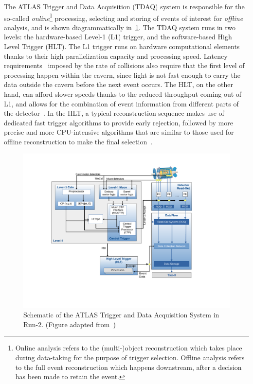 The ATLAS Trigger and Data Acquisition (TDAQ) system is responsible for the so-called \textit{online}\footnote{\label{foot:offline} Online analysis refers to the (multi-)object reconstruction which takes place during data-taking for the purpose of trigger selection. Offline analysis refers to the full event reconstruction which happens downstream, after a decision has been made to retain the event.} processing, selecting and storing of events of interest for \textit{offline} analysis, and is shown diagrammatically in~\cref{fig:tdaq}. The TDAQ system runs in two levels: the hardware-based Level-1 (L1) trigger, and the software-based High Level Trigger (HLT). The L1 trigger runs on hardware computational elements thanks to their high parallelization capacity and processing speed. Latency requirements~\cite{ATLAS_TDAQ} imposed by the rate of collisions also require that the first level of processing happen within the cavern, since light is not fast enough to carry the data outside the cavern before the next event occurs. The HLT, on the other hand, can afford slower speeds thanks to the reduced throughput coming out of L1, and allows for the combination of event information from different parts of the detector~\cite{ATLAS_TDAQ}. In the HLT, a typical reconstruction sequence makes use of dedicated fast trigger algorithms to provide early rejection, followed by more precise and more CPU-intensive algorithms that are similar to those used for offline reconstruction to make the final selection~\cite{ATLAS_TDAQ}.

\begin{figure}[!ht]
    \centering
    \includegraphics[width=0.7\linewidth]{figures//experiment/TDAQSystem.pdf}
    \caption{Schematic of the ATLAS Trigger and Data Acquisition System in Run-2. (Figure adapted from~\cite{ATLAS_TDAQ})}
    \label{fig:tdaq}
\end{figure}

